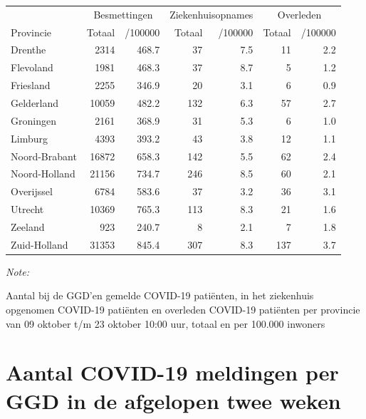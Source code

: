 \documentclass[
  english,
  man,floatsintext]{apa6}
\begin{document}
\begin{table}[H]
\centering
\begin{threeparttable}
\begin{tabular}{lrrrrrr}
\toprule
\multicolumn{1}{c}{ } & \multicolumn{2}{c}{Besmettingen} & \multicolumn{2}{c}{Ziekenhuisopnames} & \multicolumn{2}{c}{Overleden} \\
\cmidrule(l{3pt}r{3pt}){2-3} \cmidrule(l{3pt}r{3pt}){4-5} \cmidrule(l{3pt}r{3pt}){6-7}
Provincie & Totaal & /100000 & Totaal & /100000 & Totaal & /100000\\
\midrule
Drenthe & 2314 & 468.7 & 37 & 7.5 & 11 & 2.2\\
Flevoland & 1981 & 468.3 & 37 & 8.7 & 5 & 1.2\\
Friesland & 2255 & 346.9 & 20 & 3.1 & 6 & 0.9\\
Gelderland & 10059 & 482.2 & 132 & 6.3 & 57 & 2.7\\
Groningen & 2161 & 368.9 & 31 & 5.3 & 6 & 1.0\\
Limburg & 4393 & 393.2 & 43 & 3.8 & 12 & 1.1\\
Noord-Brabant & 16872 & 658.3 & 142 & 5.5 & 62 & 2.4\\
Noord-Holland & 21156 & 734.7 & 246 & 8.5 & 60 & 2.1\\
Overijssel & 6784 & 583.6 & 37 & 3.2 & 36 & 3.1\\
Utrecht & 10369 & 765.3 & 113 & 8.3 & 21 & 1.6\\
Zeeland & 923 & 240.7 & 8 & 2.1 & 7 & 1.8\\
Zuid-Holland & 31353 & 845.4 & 307 & 8.3 & 137 & 3.7\\
\bottomrule
\end{tabular}
\begin{tablenotes}
\item \textit{Note: } 
\item Aantal bij de GGD’en gemelde COVID-19 patiënten, in het ziekenhuis opgenomen COVID-19 patiënten en overleden COVID-19 patiënten per provincie van 09 oktober t/m 23 oktober 10:00 uur, totaal en per 100.000 inwoners
\end{tablenotes}
\end{threeparttable}
\end{table}

\newpage

\hypertarget{aantal-covid-19-meldingen-per-ggd-in-de-afgelopen-twee-weken}{%
\section{Aantal COVID-19 meldingen per GGD in de afgelopen twee weken}\label{aantal-covid-19-meldingen-per-ggd-in-de-afgelopen-twee-weken}}
\end{document}
